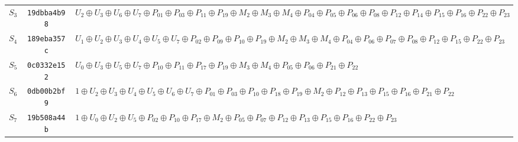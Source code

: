 \begin{longtable}{@{}rc>{\raggedright\arraybackslash}p{}@{}}
$S_3$ & \texttt{19dbba4b98} & $U_2\mathbin{\oplus}\allowbreak U_3\mathbin{\oplus}\allowbreak U_6\mathbin{\oplus}\allowbreak U_7\mathbin{\oplus}\allowbreak P_{01}\mathbin{\oplus}\allowbreak P_{03}\mathbin{\oplus}\allowbreak P_{11}\mathbin{\oplus}\allowbreak P_{19}\mathbin{\oplus}\allowbreak M_2\mathbin{\oplus}\allowbreak M_3\mathbin{\oplus}\allowbreak M_4\mathbin{\oplus}\allowbreak P_{04}\mathbin{\oplus}\allowbreak P_{05}\mathbin{\oplus}\allowbreak P_{06}\mathbin{\oplus}\allowbreak P_{08}\mathbin{\oplus}\allowbreak P_{12}\mathbin{\oplus}\allowbreak P_{14}\mathbin{\oplus}\allowbreak P_{15}\mathbin{\oplus}\allowbreak P_{16}\mathbin{\oplus}\allowbreak P_{22}\mathbin{\oplus}\allowbreak P_{23}$ \\
$S_4$ & \texttt{189eba357c} & $U_1\mathbin{\oplus}\allowbreak U_2\mathbin{\oplus}\allowbreak U_3\mathbin{\oplus}\allowbreak U_4\mathbin{\oplus}\allowbreak U_5\mathbin{\oplus}\allowbreak U_7\mathbin{\oplus}\allowbreak P_{02}\mathbin{\oplus}\allowbreak P_{09}\mathbin{\oplus}\allowbreak P_{10}\mathbin{\oplus}\allowbreak P_{19}\mathbin{\oplus}\allowbreak M_2\mathbin{\oplus}\allowbreak M_3\mathbin{\oplus}\allowbreak M_4\mathbin{\oplus}\allowbreak P_{04}\mathbin{\oplus}\allowbreak P_{06}\mathbin{\oplus}\allowbreak P_{07}\mathbin{\oplus}\allowbreak P_{08}\mathbin{\oplus}\allowbreak P_{12}\mathbin{\oplus}\allowbreak P_{15}\mathbin{\oplus}\allowbreak P_{22}\mathbin{\oplus}\allowbreak P_{23}$ \\
$S_5$ & \texttt{0c0332e152} & $U_0\mathbin{\oplus}\allowbreak U_3\mathbin{\oplus}\allowbreak U_5\mathbin{\oplus}\allowbreak U_7\mathbin{\oplus}\allowbreak P_{10}\mathbin{\oplus}\allowbreak P_{11}\mathbin{\oplus}\allowbreak P_{17}\mathbin{\oplus}\allowbreak P_{19}\mathbin{\oplus}\allowbreak M_3\mathbin{\oplus}\allowbreak M_4\mathbin{\oplus}\allowbreak P_{05}\mathbin{\oplus}\allowbreak P_{06}\mathbin{\oplus}\allowbreak P_{21}\mathbin{\oplus}\allowbreak P_{22}$ \\
$S_6$ & \texttt{0db00b2bf9} & $1\mathbin{\oplus}\allowbreak U_2\mathbin{\oplus}\allowbreak U_3\mathbin{\oplus}\allowbreak U_4\mathbin{\oplus}\allowbreak U_5\mathbin{\oplus}\allowbreak U_6\mathbin{\oplus}\allowbreak U_7\mathbin{\oplus}\allowbreak P_{01}\mathbin{\oplus}\allowbreak P_{03}\mathbin{\oplus}\allowbreak P_{10}\mathbin{\oplus}\allowbreak P_{18}\mathbin{\oplus}\allowbreak P_{19}\mathbin{\oplus}\allowbreak M_2\mathbin{\oplus}\allowbreak P_{12}\mathbin{\oplus}\allowbreak P_{13}\mathbin{\oplus}\allowbreak P_{15}\mathbin{\oplus}\allowbreak P_{16}\mathbin{\oplus}\allowbreak P_{21}\mathbin{\oplus}\allowbreak P_{22}$ \\
$S_7$ & \texttt{19b508a44b} & $1\mathbin{\oplus}\allowbreak U_0\mathbin{\oplus}\allowbreak U_2\mathbin{\oplus}\allowbreak U_5\mathbin{\oplus}\allowbreak P_{02}\mathbin{\oplus}\allowbreak P_{10}\mathbin{\oplus}\allowbreak P_{17}\mathbin{\oplus}\allowbreak M_2\mathbin{\oplus}\allowbreak P_{05}\mathbin{\oplus}\allowbreak P_{07}\mathbin{\oplus}\allowbreak P_{12}\mathbin{\oplus}\allowbreak P_{13}\mathbin{\oplus}\allowbreak P_{15}\mathbin{\oplus}\allowbreak P_{16}\mathbin{\oplus}\allowbreak P_{22}\mathbin{\oplus}\allowbreak P_{23}$ \\
\end{longtable}
\endgroup
